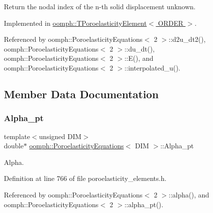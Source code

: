 Return the nodal index of the n-\/th solid displacement unknown. 



Implemented in \hyperlink{classoomph_1_1TPoroelasticityElement_a23b1b0c75019070b07760815745cd742}{oomph\+::\+T\+Poroelasticity\+Element$<$ O\+R\+D\+E\+R $>$}.



Referenced by oomph\+::\+Poroelasticity\+Equations$<$ 2 $>$\+::d2u\+\_\+dt2(), oomph\+::\+Poroelasticity\+Equations$<$ 2 $>$\+::du\+\_\+dt(), oomph\+::\+Poroelasticity\+Equations$<$ 2 $>$\+::\+E(), and oomph\+::\+Poroelasticity\+Equations$<$ 2 $>$\+::interpolated\+\_\+u().



\subsection{Member Data Documentation}
\mbox{\label{classoomph_1_1PoroelasticityEquations_a54c041adaebdbbf30e16becf2540edbe}} 
\subsubsection{\texorpdfstring{Alpha\+\_\+pt}{Alpha\_pt}}
{\footnotesize\ttfamily template$<$unsigned D\+IM$>$ \\
double$\ast$ \hyperlink{classoomph_1_1PoroelasticityEquations}{oomph\+::\+Poroelasticity\+Equations}$<$ D\+IM $>$\+::Alpha\+\_\+pt\hspace{0.3cm}{\ttfamily [private]}}



Alpha. 



Definition at line 766 of file poroelasticity\+\_\+elements.\+h.



Referenced by oomph\+::\+Poroelasticity\+Equations$<$ 2 $>$\+::alpha(), and oomph\+::\+Poroelasticity\+Equations$<$ 2 $>$\+::alpha\+\_\+pt().

\mbox{\label{classoomph_1_1PoroelasticityEquations_a965748b26ceb0e5b2277b38eceb00444}} 
